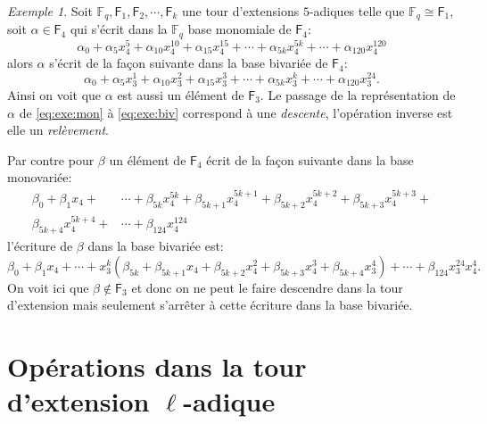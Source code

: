 \documentclass[10pt,a4paper]{book}
\theoremstyle{plain}
\theoremstyle{definition}
\theoremstyle{definition}
\theoremstyle{definition}
\theoremstyle{definition}
\theoremstyle{definition}
\theoremstyle{remark}
\theoremstyle{remark}
\newtheorem{exe}[thm]{Exemple}
\theoremstyle{definition}
\begin{document}
\begin{exe}
Soit $\mathbb{F}_q, \mathsf{F}_1, \mathsf{F}_2, \cdots, \mathsf{F}_k$ une tour d'extensions $5$-adiques telle que $\mathbb{F}_q \cong \mathsf{F}_1$, soit $\alpha \in \mathsf{F}_4$ qui s'écrit dans la $\mathbb{F}_q$ base monomiale de $\mathsf{F}_4$:
\begin{equation}
\label{eq:exe:mon}
\alpha_0 + \alpha_5x_4^5+ \alpha_{10}x_4^{10} + \alpha_{15}x_4^{15} + \cdots + \alpha_{5k}x_4^{5k} + \cdots + \alpha_{120}x_4^{120} 
\end{equation} 
alors $\alpha$ s'écrit de la façon suivante dans la base bivariée de $\mathsf{F}_4$:
\begin{equation}
\label{eq:exe:biv}
\alpha_0 + \alpha_5x_3^1+ \alpha_{10}x_3^{2} + \alpha_{15}x_3^{3} + \cdots + \alpha_{5k}x_3^{k} + \cdots + \alpha_{120}x_3^{24}. 
\end{equation} 
 Ainsi on voit que $\alpha$ est aussi un élément de $\mathsf{F}_3$. Le passage de la représentation de $\alpha$ de \eqref{eq:exe:mon} à \eqref{eq:exe:biv} correspond à une \emph{descente}, l'opération inverse est elle un \emph{relèvement}.
 
 Par contre pour $\beta$ un élément de $\mathsf{F}_4$ écrit de la façon suivante dans la base monovariée:
 \begin{equation*}
 \begin{alignedat}{1}
 \beta_0 +  \beta_1 x_4+ & \cdots + \beta_{5k}x_4^{5k} + \beta_{5k+1}x_4^{5k+1}+\beta_{5k+2}x_4^{5k+2}+ \beta_{5k+3}x_4^{5k+3}+ \\  \beta_{5k+4}x_4^{5k+4}+ 
  & \cdots + \beta_{124}x_4^{124}
 \end{alignedat}
 \end{equation*}
l'écriture de $\beta$ dans la base bivariée est: 
 \begin{equation*}
  \beta_0 + \beta_1 x_4+ \cdots + x_3^{k}(\beta_{5k}+\beta_{5k+1} x_4 + \beta_{5k+2} x_4^2 + \beta_{5k+3} x_4^3 + \beta_{5k+4}x_3^4)+ \cdots + \beta_{124}x_3^{24}x_4^{4}.
 \end{equation*}
 On voit ici que $\beta \notin \mathsf{F}_3$ et donc on ne peut le faire descendre dans la tour d'extension mais seulement s'arrêter à cette écriture dans la base bivariée.
\end{exe}

\section{Opérations dans la tour d'extension $\ell$-adique}
\end{document}
